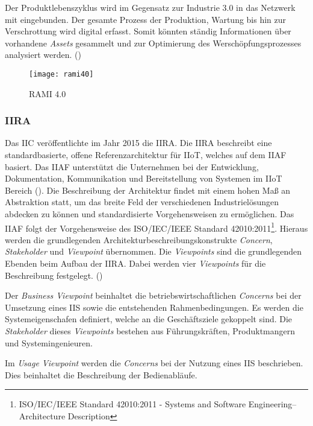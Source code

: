Der Produktlebenszyklus wird im Gegensatz zur Industrie 3.0 in das Netzwerk mit eingebunden. Der gesamte Prozess der Produktion, Wartung bis hin zur Verschrottung wird digital erfasst. Somit könnten ständig Informationen über vorhandene \textit{Assets} gesammelt und zur Optimierung des Werschöpfungsprozesses analysiert werden. (\cite{RAMISpec})

\begin{figure}[h]
  \centering
  \texttt{[image: rami40]}
  \caption{RAMI 4.0}
  \label{Grundlagen:RAMI4.0-img}
\end{figure}

\clearpage

\subsubsection{IIRA}
\label{Grundlagen:IIRA}
Das \ac{IIC} veröffentlichte im Jahr 2015 die \ac{IIRA}. Die \ac{IIRA} beschreibt eine standardbasierte, offene Referenzarchitektur für \ac{IIoT}, welches auf dem \ac{IIAF} basiert. Das \ac{IIAF} unterstützt die Unternehmen bei der Entwicklung, Dokumentation, Kommunikation und Bereitstellung von Systemen im \ac{IIoT} Bereich (\cite{iira2017}). Die Beschreibung der Architektur findet mit einem hohen Maß an Abstraktion statt, um das breite Feld der verschiedenen Industrielösungen abdecken zu können und standardisierte Vorgehensweisen zu ermöglichen. Das \ac{IIAF} folgt der Vorgehensweise des ISO/IEC/IEEE Standard 42010:2011\footnote{ISO/IEC/IEEE Standard 42010:2011 - Systems and Software Engineering–Architecture Description}. Hieraus werden die grundlegenden Architekturbeschreibungskonstrukte \textit{Concern}, \textit{Stakeholder} und \textit{Viewpoint} übernommen. Die \textit{Viewpoints} sind die grundlegenden Ebenden beim Aufbau der \ac{IIRA}. Dabei werden vier \textit{Viewpoints} für die Beschreibung festgelegt. (\cite{heidrich2016})

Der \textit{Business Viewpoint} beinhaltet die betriebswirtschaftlichen \textit{Concerns} bei der Umsetzung eines \ac{IIS} sowie die entstehenden Rahmenbedingungen. Es werden die Systemeigenschafen definiert, welche an die Geschäftsziele gekoppelt sind. Die \textit{Stakeholder} dieses \textit{Viewpoints} bestehen aus Führungskräften, Produktmangern und Systemingenieuren.

Im \textit{Usage Viewpoint} werden die \textit{Concerns} bei der Nutzung eines \ac{IIS} beschrieben. Dies beinhaltet die Beschreibung der Bedienabläufe.

